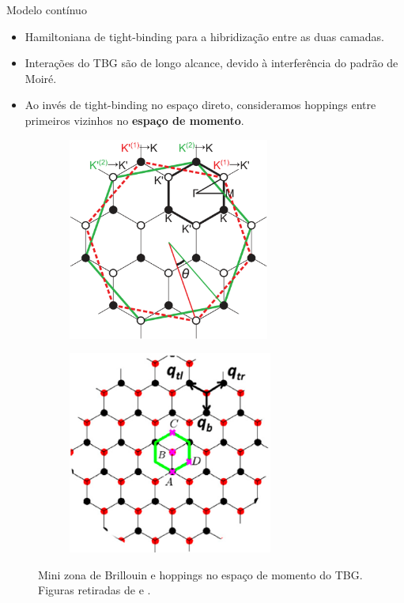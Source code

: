 \documentclass[8pt,aspectratio=169,xcolor={table,dvipsnames,usenames}]{beamer}
\begin{document}

\begin{frame}{Modelo contínuo}

\begin{itemize}
\item Hamiltoniana de tight-binding para a hibridização entre as duas camadas.
\item Interações do TBG são de longo alcance, devido à interferência do padrão de Moiré.
\item Ao invés de tight-binding no espaço direto, consideramos hoppings entre primeiros vizinhos no \textbf{espaço de momento}.
\end{itemize}

\begin{figure}[H]
\centering
\begin{subfigure}{.48\textwidth}
  \centering
  \includegraphics[height=18em]{fig/minibz.png}
  \label{fig:minibz}
\end{subfigure}%
\quad
\begin{subfigure}{.48\textwidth}
  \centering
  \includegraphics[height=18em]{fig/tightbinding-q.png}
  \label{fig:tightbinding-q}
\end{subfigure}
\caption{Mini zona de Brillouin e hoppings no espaço de momento do TBG. Figuras retiradas de \cite{koshino} e \cite{macdonald}.}
\label{fig:tbg-bz}
\end{figure}


\end{frame}
\end{document}
